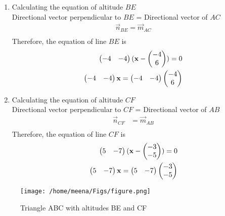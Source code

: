 \documentclass[12pt]{article}
\begin{document}
\begin{enumerate}
\item Calculating the equation of altitude $BE$\\
Directional vector perpendicular to $BE$ = Directional vector of $AC$
\begin{align}
\vec{n}_{BE} = \vec{m}_{AC}\\
\end{align}
Therefore, the equation of line $BE$ is
\begin{align}
\begin{pmatrix}-4&-4\end{pmatrix}(\mathbf{x}-\begin{pmatrix}-4\\6\\\end{pmatrix})=0\\
\begin{pmatrix}-4&-4\end{pmatrix}\mathbf{x}=\begin{pmatrix}-4&-4\end{pmatrix}\begin{pmatrix}-4\\6\\\end{pmatrix}\\
\end{align}
\item Calculating the equation of altitude $CF$\\
Directional vector perpendicular to $CF$ = Directional vector of $AB$
\begin{align}
\vec{n}_{CF} &= \vec{m}_{AB}\\
\end{align}
Therefore, the equation of line $CF$ is 
\begin{align}
\begin{pmatrix}5&-7\end{pmatrix}(\mathbf{x}-\begin{pmatrix}-3\\-5\\\end{pmatrix})=0\\
\begin{pmatrix}5&-7\end{pmatrix}\mathbf{x}=\begin{pmatrix}5&-7\end{pmatrix}\begin{pmatrix}-3\\-5\\\end{pmatrix}\\
\end{align}
\end{enumerate}
\begin{figure} [htbp]
\texttt{[image: /home/meena/Figs/figure.png]}
\caption{Triangle ABC with altitudes BE and CF}
\label{fig}
\end{figure}
\end{document}
